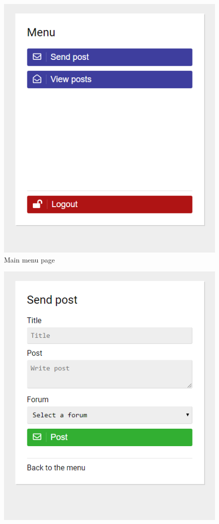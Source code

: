 \begin{table}[H]
\begin{minipage}{.33\textwidth}
\begin{figure}[H]
            \includegraphics[width=0.95\linewidth]{InteraktionsDesign/Assets/Prototype/2.png}
            \caption{Main menu page}
            \label{fig:prototype2}
        \end{figure}
    \end{minipage}
    \begin{minipage}{.33\textwidth}
        \begin{figure}[H]
            \centering
            \includegraphics[width=0.95\linewidth]{InteraktionsDesign/Assets/Prototype/3.png}

\end{figure}
\end{minipage}
\end{table}
